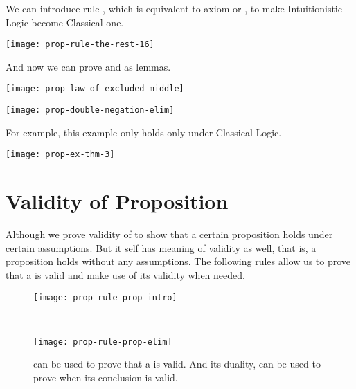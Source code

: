 \documentclass[master.tex]{subfiles}
\begin{document}
We can introduce rule , which is equivalent to
axiom  or , to make
Intuitionistic Logic become Classical one.

\begin{center}
\texttt{[image: prop-rule-the-rest-16]}
\end{center}

And now we can prove  and
 as lemmas.

\begin{center}
  \texttt{[image: prop-law-of-excluded-middle]}
\end{center}

\begin{center}
  \texttt{[image: prop-double-negation-elim]}
\end{center}

\hspace{1ex}

For example, this example only holds only under Classical Logic.

\hspace{1ex}

\begin{center}
  \texttt{[image: prop-ex-thm-3]}
\end{center}

\newpage

\section{Validity of Proposition}
\label{sec:validity_of_proposition}

Although we prove validity of  to show that a certain proposition
holds under certain assumptions. But  it self has meaning of validity
as well, that is, a proposition holds without any assumptions. The following
rules allow us to prove that a  is valid and make use of its validity
when needed.

\begin{figure}[H]
    \centering


\begin{minipage}{0.48\textwidth}
\begin{flushleft}
\texttt{[image: prop-rule-prop-intro]}
\end{flushleft}
\end{minipage}
~
\begin{minipage}{0.48\textwidth}
\begin{flushright}
\texttt{[image: prop-rule-prop-elim]}
\end{flushright}
\end{minipage}

\caption{ can be used to prove that a  is valid.
  And its duality,  can be used to prove  when
  its conclusion is valid.}
\label{fig:prop-rule-prop-intro-elim}
\end{figure}
\end{document}

